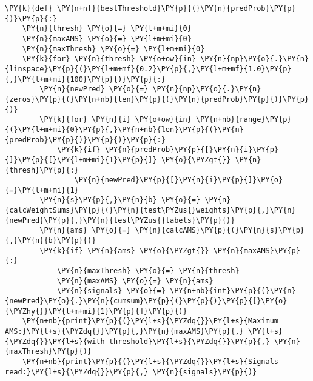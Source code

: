 {\par%
\vspace{-1\baselineskip}%
}%
\begin{notebookcell}[]%
\begin{addmargin}[\cellleftmargin]{0em}%
{\smaller%
\par%
%
\vspace{-1\smallerfontscale}%
\begin{Verbatim}[commandchars=\\\{\}]
\PY{k}{def} \PY{n+nf}{bestThreshold}\PY{p}{(}\PY{n}{predProb}\PY{p}{)}\PY{p}{:}
    \PY{n}{thresh} \PY{o}{=} \PY{l+m+mi}{0}
    \PY{n}{maxAMS} \PY{o}{=} \PY{l+m+mi}{0}
    \PY{n}{maxThresh} \PY{o}{=} \PY{l+m+mi}{0}
    \PY{k}{for} \PY{n}{thresh} \PY{o+ow}{in} \PY{n}{np}\PY{o}{.}\PY{n}{linspace}\PY{p}{(}\PY{l+m+mf}{0.2}\PY{p}{,}\PY{l+m+mf}{1.0}\PY{p}{,}\PY{l+m+mi}{100}\PY{p}{)}\PY{p}{:}
        \PY{n}{newPred} \PY{o}{=} \PY{n}{np}\PY{o}{.}\PY{n}{zeros}\PY{p}{(}\PY{n+nb}{len}\PY{p}{(}\PY{n}{predProb}\PY{p}{)}\PY{p}{)}
        \PY{k}{for} \PY{n}{i} \PY{o+ow}{in} \PY{n+nb}{range}\PY{p}{(}\PY{l+m+mi}{0}\PY{p}{,}\PY{n+nb}{len}\PY{p}{(}\PY{n}{predProb}\PY{p}{)}\PY{p}{)}\PY{p}{:}
            \PY{k}{if} \PY{n}{predProb}\PY{p}{[}\PY{n}{i}\PY{p}{]}\PY{p}{[}\PY{l+m+mi}{1}\PY{p}{]} \PY{o}{\PYZgt{}} \PY{n}{thresh}\PY{p}{:}
                \PY{n}{newPred}\PY{p}{[}\PY{n}{i}\PY{p}{]}\PY{o}{=}\PY{l+m+mi}{1}
        \PY{n}{s}\PY{p}{,}\PY{n}{b} \PY{o}{=} \PY{n}{calcWeightSums}\PY{p}{(}\PY{n}{test\PYZus{}weights}\PY{p}{,}\PY{n}{newPred}\PY{p}{,}\PY{n}{test\PYZus{}labels}\PY{p}{)}
        \PY{n}{ams} \PY{o}{=} \PY{n}{calcAMS}\PY{p}{(}\PY{n}{s}\PY{p}{,}\PY{n}{b}\PY{p}{)}
        \PY{k}{if} \PY{n}{ams} \PY{o}{\PYZgt{}} \PY{n}{maxAMS}\PY{p}{:}
            \PY{n}{maxThresh} \PY{o}{=} \PY{n}{thresh}
            \PY{n}{maxAMS} \PY{o}{=} \PY{n}{ams}
            \PY{n}{signals} \PY{o}{=} \PY{n+nb}{int}\PY{p}{(}\PY{n}{newPred}\PY{o}{.}\PY{n}{cumsum}\PY{p}{(}\PY{p}{)}\PY{p}{[}\PY{o}{\PYZhy{}}\PY{l+m+mi}{1}\PY{p}{]}\PY{p}{)}
    \PY{n+nb}{print}\PY{p}{(}\PY{l+s}{\PYZdq{}}\PY{l+s}{Maximum AMS:}\PY{l+s}{\PYZdq{}}\PY{p}{,}\PY{n}{maxAMS}\PY{p}{,} \PY{l+s}{\PYZdq{}}\PY{l+s}{with threshold}\PY{l+s}{\PYZdq{}}\PY{p}{,} \PY{n}{maxThresh}\PY{p}{)}
    \PY{n+nb}{print}\PY{p}{(}\PY{l+s}{\PYZdq{}}\PY{l+s}{Signals read:}\PY{l+s}{\PYZdq{}}\PY{p}{,} \PY{n}{signals}\PY{p}{)}
\end{Verbatim}
%
\par%
\vspace{-1\smallerfontscale}}%
\end{addmargin}
\end{notebookcell}


